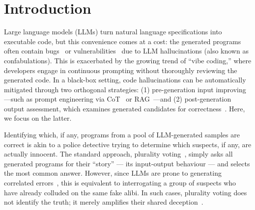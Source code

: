 \documentclass[acmsmall,screen,nonacm]{acmart}
\begin{document}



\maketitle

\vspace{-1mm}

\section{Introduction}

Large language models (LLMs) turn natural language specifications into executable code, but this convenience comes at a cost: the generated programs often contain bugs~\cite{liu2024exploring} or vulnerabilities~\cite{pearce2025asleep} due to LLM hallucinations (also known as confabulations). This is exacerbated by the growing trend of ``vibe coding,'' where developers engage in continuous prompting without thoroughly reviewing the generated code. In a black-box setting, code hallucinations can be automatically mitigated through two orthogonal strategies: (1) pre-generation input improving---such as prompt engineering via CoT~\cite{wei2022chain} or RAG~\cite{lewis2020retrieval}---and (2) post-generation output assessment, which examines generated candidates for correctness~\cite{feng2024don}. Here, we focus on the latter.


Identifying which, if any, programs from a pool of LLM-generated samples are correct is akin to a police detective trying to determine which suspects, if any, are actually innocent. The standard approach, plurality voting~\cite{hansen2002neural}, simply asks all generated programs for their ``story'' --- its input-output behaviour --- and selects the most common answer. However, since LLMs are prone to generating correlated errors~\cite{kim2025correlated}, this is equivalent to interrogating a group of suspects who have already colluded on the same fake alibi. In such cases, plurality voting does not identify the truth; it merely amplifies their shared deception~\cite{tumer1996error}.
\end{document}

